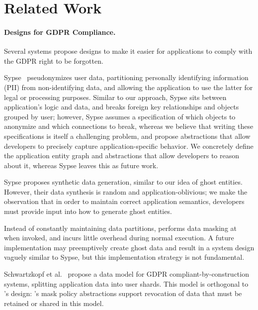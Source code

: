 \section{Related Work}
\label{sec:related}

\paragraph{Designs for GDPR Compliance.}
Several systems propose designs to make it easier for applications to comply with the GDPR right to
be forgotten.

Sypse~\cite{sypse} pseudonymizes user data, partitioning personally identifying information (PII)
from non-identifying data, and allowing the application to use the latter for legal or processing
purposes. Similar to our approach, Sypse sits between application's logic and data, and breaks
foreign key relationships and objects grouped by user; however, Sypse assumes a specification of
which objects to anonymize and which connections to break, whereas we believe that writing these
specifications is itself a challenging problem, and propose abstractions that allow developers to
precisely capture application-specific behavior. We concretely define the application entity graph
and abstractions that allow developers to reason about it, whereas Sypse leaves this as future work.

Sypse proposes synthetic data generation, similar to our idea of ghost entities. However, their data
synthesis is random and application-oblivious; we make the observation that in order to maintain
correct application semantics, developers must provide input into how to generate ghost entities.

Instead of constantly maintaining data partitions, \sys performs data masking at  when invoked, and
incurs little overhead during normal execution. A future implementation may preemptively create
ghost data and result in a system design vaguely similar to Sypse, but this implementation strategy
is not fundamental.

Schwartzkopf et al.~\cite{usershards} propose a data model for GDPR compliant-by-construction
systems, splitting application data into user shards. This model is orthogonal to \sys's design:
\sys's mask policy abstractions support revocation of data that must be retained or shared in this
model.

